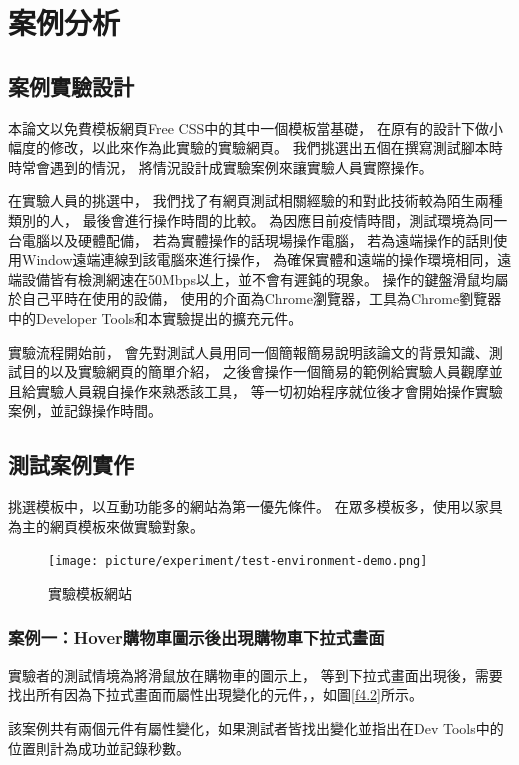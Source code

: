 \chapter{案例分析}
\section{案例實驗設計}\label{s4.1}
\indent
本論文以免費模板網頁Free CSS中的其中一個模板當基礎，
在原有的設計下做小幅度的修改，以此來作為此實驗的實驗網頁。
我們挑選出五個在撰寫測試腳本時時常會遇到的情況，
將情況設計成實驗案例來讓實驗人員實際操作。

在實驗人員的挑選中，
我們找了有網頁測試相關經驗的和對此技術較為陌生兩種類別的人，
最後會進行操作時間的比較。
為因應目前疫情時間，測試環境為同一台電腦以及硬體配備，
若為實體操作的話現場操作電腦，
若為遠端操作的話則使用Window遠端連線到該電腦來進行操作，
為確保實體和遠端的操作環境相同，遠端設備皆有檢測網速在50Mbps以上，並不會有遲鈍的現象。
操作的鍵盤滑鼠均屬於自己平時在使用的設備，
使用的介面為Chrome瀏覽器，工具為Chrome劉覽器中的Developer Tools和本實驗提出的擴充元件。

實驗流程開始前，
會先對測試人員用同一個簡報簡易說明該論文的背景知識、測試目的以及實驗網頁的簡單介紹，
之後會操作一個簡易的範例給實驗人員觀摩並且給實驗人員親自操作來熟悉該工具，
等一切初始程序就位後才會開始操作實驗案例，並記錄操作時間。

\section{測試案例實作}\label{s4.2}
挑選模板中，以互動功能多的網站為第一優先條件。
在眾多模板多，使用以家具為主的網頁模板\cite{Furn-Free-CSS-Template}來做實驗對象。

\begin{figure}[H]
    \centering
    \texttt{[image: picture/experiment/test-environment-demo.png]}
    \caption{實驗模板網站}
    \label{f4.1}
\end{figure}

\indent

\subsection{案例一：Hover購物車圖示後出現購物車下拉式畫面}\label{s4.2.1}
\indent
實驗者的測試情境為將滑鼠放在購物車的圖示上，
等到下拉式畫面出現後，需要找出所有因為下拉式畫面而屬性出現變化的元件，，如圖\ref{f4.2}所示。

該案例共有兩個元件有屬性變化，如果測試者皆找出變化並指出在Dev Tools中的位置則計為成功並記錄秒數。

